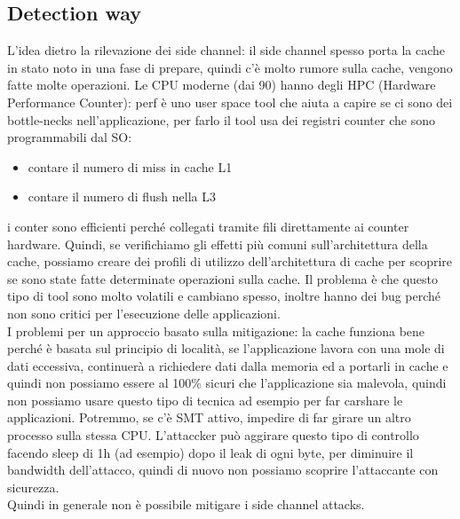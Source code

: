 \documentclass[12pt, oneside]{extbook} %
\begin{document}
\subsection{Detection way}
L'idea dietro la rilevazione dei side channel: il side channel spesso porta la cache in stato noto in una fase di prepare, quindi c'è molto rumore sulla cache, vengono fatte molte operazioni. Le CPU moderne (dai 90) hanno degli HPC (Hardware Performance Counter): perf è uno user space tool che aiuta a capire se ci sono dei bottle-necks nell'applicazione, per farlo il tool usa dei registri counter che sono programmabili dal SO:
\begin{itemize}
\item contare il numero di miss in cache L1
\item contare il numero di flush nella L3
\end{itemize}
i conter sono efficienti perché collegati tramite fili direttamente ai counter hardware. Quindi, se verifichiamo gli effetti più comuni sull'architettura della cache, possiamo creare dei profili di utilizzo dell'architettura di cache per scoprire se sono state fatte determinate operazioni sulla cache. Il problema è che questo tipo di tool sono molto volatili e cambiano spesso, inoltre hanno dei bug perché non sono critici per l'esecuzione delle applicazioni.\\ I problemi per un approccio basato sulla mitigazione: la cache funziona bene perché è basata sul principio di località, se l'applicazione lavora con una mole di dati eccessiva, continuerà a richiedere dati dalla memoria ed a portarli in cache e quindi non possiamo essere al 100\% sicuri che l'applicazione sia malevola, quindi non possiamo usare questo tipo di tecnica ad esempio per far carshare le applicazioni. Potremmo, se c'è SMT attivo, impedire di far girare un altro processo sulla stessa CPU. L'attaccker può aggirare questo tipo di controllo facendo sleep di 1h (ad esempio) dopo il leak di ogni byte, per diminuire il bandwidth dell'attacco, quindi di nuovo non possiamo scoprire l'attaccante con sicurezza.\\ Quindi in generale non è possibile mitigare i side channel attacks.
\end{document}
